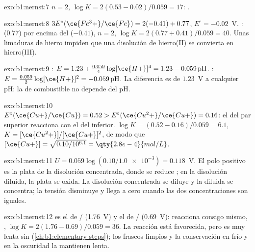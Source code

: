 \begin{solution}{exo:b1:nernst:7}
$n = 2$, $\log K = 2(0.53 - 0.02)/0.059 = 17$: .
\end{solution}

\begin{solution}{exo:b1:nernst:8}
$3E^\circ(\ce{Fe^3+}/\ce{Fe}) = 2(-0.41) + 0.77$, $E^\circ = -0.02$~V.
:   (0.77) por encima del
  ($-0.41$), $n = 2$, $\log K = 2(0.77 + 0.41)/0.059 = 40$.
Unas limaduras de hierro impiden que una disolución de hierro(II) se
convierta en hierro(III).
\end{solution}

\begin{solution}{exo:b1:nernst:9}
: $E = 1.23 + \frac{0.059}{4}\log [\ce{H+}]^4 =
1.23 - 0.059\,\mathrm{pH}$. : $E = \frac{0.059}{2}\log
[\ce{H+}]^2 = -0.059\,\mathrm{pH}$. La diferencia es de $1.23$~V a
cualquier pH: la  de combustible no depende del pH.
\end{solution}

\begin{solution}{exo:b1:nernst:10}
$E^\circ(\ce{Cu+}/\ce{Cu}) = 0.52 > E^\circ(\ce{Cu^2+}/\ce{Cu+}) = 0.16$:
el   del par superior reacciona con el  
del inferior. $\log K = (0.52 - 0.16)/0.059 = 6.1$, $K =
[\ce{Cu^2+}]/[\ce{Cu+}]^2$, de modo que $[\ce{Cu+}] = \sqrt{0.10/10^{6.1}} =
\qty{2.8e-4}{mol/L}$.
\end{solution}

\begin{solution}{exo:b1:nernst:11}
$U = 0.059\log(0.10/\num{1.0e-3}) = 0.118$~V. El polo positivo es la plata
de la disolución concentrada, donde se reduce ; en la disolución
diluida, la plata se oxida. La disolución concentrada se diluye y la
diluida se concentra; la tensión disminuye y llega a cero cuando las dos
concentraciones son iguales.
\end{solution}

\begin{solution}{exo:b1:nernst:12}
 es el  de / (1.76~V) y el  de
/ (0.69~V): reacciona consigo mismo,
,
$\log K = 2(1.76 - 0.69)/0.059 = 36$. La reacción está favorecida, pero
es muy lenta sin  (\cref{ch:b1:elementary-steps}); los frascos
limpios y la conservación en frío y en la oscuridad la mantienen lenta.
\end{solution}

